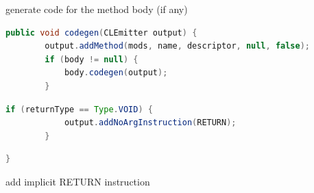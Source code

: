 \documentclass[8pt,a4paper,compress]{beamer}
\begin{document}
\begin{frame}[fragile]
\begin{overprint}
\begin{tcolorbox}[enhanced,drop shadow southwest,sharp corners,size=fbox,colback=white,fontlower=\small\ttfamily,collower=silver900]
\tcblower
\begin{minipage}[t][.2cm][t]{\textwidth}
generate code for the method body (if any)
\end{minipage}
\end{tcolorbox}

\begin{tcolorbox}[enhanced,drop shadow southwest,sharp corners,size=fbox,colback=white,fontlower=\small\ttfamily,collower=silver900]

\begin{lstlisting}[language=Java,style=focusout]
    public void codegen(CLEmitter output) {
        output.addMethod(mods, name, descriptor, null, false);
        if (body != null) {
            body.codegen(output);
        }
\end{lstlisting}
\begin{lstlisting}[language=Java,style=focusin,backgroundcolor=\color{lime100}]
        if (returnType == Type.VOID) {
            output.addNoArgInstruction(RETURN);
        }
\end{lstlisting}
\begin{lstlisting}[language=Java,style=focusout]
    }
\end{lstlisting}

\tcblower
\begin{minipage}[t][.2cm][t]{\textwidth}
add implicit RETURN instruction
\end{minipage}
\end{tcolorbox}
\end{overprint}
\end{frame}
\end{document}
